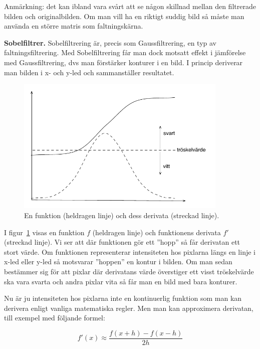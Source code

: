 Anmärkning: det kan ibland vara svårt att se någon skillnad mellan den filtrerade bilden och originalbilden. Om man vill ha en riktigt suddig bild så måste man använda en större matris som faltningskärna.


\Task  \textbf{Sobelfiltrer.} Sobelfiltrering är, precis som Gaussfiltrering, en typ av faltningsfiltrering. Med Sobelfiltrering får man dock motsatt effekt i jämförelse med Gaussfiltrering, dvs man förstärker konturer i en bild. I princip deriverar man bilden i x- och y-led och sammanställer resultatet.

\begin{figure}[H]
\includegraphics[width=0.9\textwidth]{../img/w13-assignment-imageprocessing/derivatabild2.pdf}
\caption { En funktion (heldragen linje) och dess derivata (streckad linje).}
\label{fig:imageprocessing:sobelfilter:derivatabild}
\end{figure}

I figur~\ref{fig:imageprocessing:sobelfilter:derivatabild} visas en funktion $f$ (heldragen linje) och funktionens derivata $f'$ (streckad linje). Vi ser att där funktionen gör ett ''hopp'' så får derivatan ett stort värde. Om funktionen representerar intensiteten hos pixlarna längs en linje i x-led eller y-led så motsvarar ''hoppen'' en kontur i bilden. Om man sedan bestämmer sig för att pixlar där derivatans värde överstiger ett visst tröskelvärde ska vara svarta och andra pixlar vita så får man en bild med bara konturer.

Nu är ju intensiteten hos pixlarna inte en kontinuerlig funktion som man kan derivera enligt vanliga matematiska regler. Men man kan approximera derivatan, till exempel med följande formel:

\begin{displaymath}
f'(x) \approx \frac{f(x+h) - f(x-h)}{2h}
\end{displaymath}

